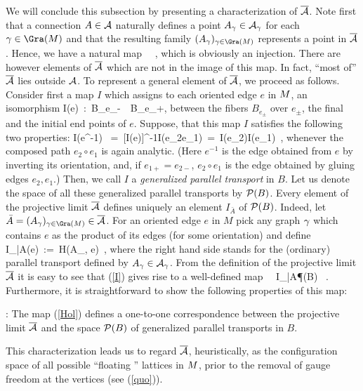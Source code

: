 We will conclude this subsection by presenting a characterization of
$\Ab$. Note first that a connection $A\in\A$ naturally defines a point
$A_\g \in \A_\g$ for each $\g\in\Gra(\S)$ and that the resulting
family $(A_\g)_{\g\in\Gra(\S)}$ represents a point in $\Ab$.  Hence,
we have a natural map
\be
\A\ \rightarrow \ \Ab,
\ee
which is obviously an injection. There are however elements of $\Ab$
which are not in the image of this map. In fact, ``most of'' $\Ab$
lies outside $\A$. To represent a general element of $\Ab$, we proceed
as follows. Consider first a map $I$ which assigns to each oriented
edge $e$ in $\S$, an isomorphism
\be
I(e)\ :\ B_{e_-}\ \rightarrow \ B_{e_+},
\ee
between the fibers $B_{e_\pm}$ over $e_\pm$, the final and the initial
end points of $e$.  Suppose, that this map $I$ satisfies the following
two properties:
\be \label{24}
I(e^{-1}) \ =\ [I(e)]^{-1}\quad I(e_2\circ e_1)\ =\ 
I(e_2)\circ I(e_1)\  ,
\ee
whenever the composed path $e_2\circ e_1$ is again analytic. (Here
$e^{-1}$ is the edge obtained from $e$ by inverting its orientation,
and, if $e_{1+}=e_{2-}$, $e_2\circ e_1$ is the edge obtained by gluing
edges $e_2, e_1$.)  Then, we call $I$ a {\it generalized parallel
transport} in $B$. Let us denote the space of all these generalized
parallel transports by $\P(B)$.  Every element of the projective limit
$\Ab$ defines uniquely an element $I_{\bar A}$ of $\P(B)$. Indeed, let
${\bar A} = (A_\g)_{\g\in\Gra(\S)} \in \Ab$. For an oriented edge $e$
in $M$ pick any graph $\g$ which contains $e$ as the product of its
edges (for some orientation) and define
\be\label{I}
I_{{\bar A}}(e)\ :=\ H(A_\g, e)\   ,
\ee
where the right hand side stands for the (ordinary) parallel transport
defined by $A_\g \in \A_{\g}$.  From the definition of the projective
limit $\Ab$ it is easy to see that (\ref{I}) gives rise to a
well-defined map
\be \label{Hol}
\Ab {}\ \mapsto\ I_{{\bar A}}\in\P(B) \ .
\ee
Furthermore, it is straightforward to show the following properties of
this map:

\begin{proposition}{\rm :}
The map (\ref{Hol}) defines a one-to-one correspondence between the
projective limit $\Ab$ and the space $\P(B)$ of generalized parallel
transports in $B$.
\end{proposition}

This characterization leads us to regard $\Ab$, heuristically, as the
configuration space of all possible ``floating '' lattices in $\S$,
prior to the removal of gauge freedom at the vertices (see
(\ref{quo})).

